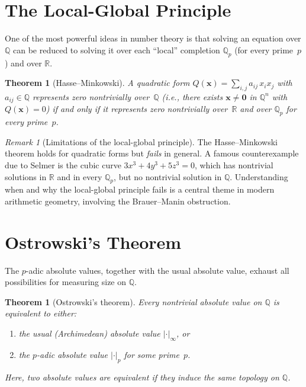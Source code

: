 \documentclass[12pt,a4paper,openany]{book}
\theoremstyle{definition}
\theoremstyle{plain}
\newtheorem{theorem}[definition]{Theorem}
\theoremstyle{remark}
\newtheorem{remark}[definition]{Remark}
\newcommand{\Q}{\mathbb{Q}}
\newcommand{\R}{\mathbb{R}}
\newcommand{\abs}[1]{\left|#1\right|}
\begin{document}
\section{The Local-Global Principle}
\label{sec:local-global}

One of the most powerful ideas in number theory is that solving an equation
over $\Q$ can be reduced to solving it over each ``local'' completion
$\Q_p$ (for every prime~$p$) and over $\R$.

\begin{theorem}[Hasse--Minkowski]
\label{thm:hasse-minkowski}
A quadratic form $Q(\mathbf{x}) = \sum_{i,j} a_{ij}\, x_i x_j$ with
$a_{ij} \in \Q$ represents zero nontrivially over~$\Q$ (i.e., there exists
$\mathbf{x} \neq \mathbf{0}$ in $\Q^n$ with $Q(\mathbf{x})=0$) if and only if
it represents zero nontrivially over~$\R$ and over $\Q_p$ for every prime~$p$.
\end{theorem}

\begin{remark}[Limitations of the local-global principle]
\label{rem:local-global-limitations}
The Hasse--Minkowski theorem holds for quadratic forms but \emph{fails} in
general. A famous counterexample due to Selmer is the cubic curve
$3x^3 + 4y^3 + 5z^3 = 0$, which has nontrivial solutions in $\R$ and in every
$\Q_p$, but no nontrivial solution in $\Q$. Understanding when and why the
local-global principle fails is a central theme in modern arithmetic geometry,
involving the Brauer--Manin obstruction.
\end{remark}

\section{Ostrowski's Theorem}
\label{sec:ostrowski}

The $p$-adic absolute values, together with the usual absolute value, exhaust
all possibilities for measuring size on $\Q$.

\begin{theorem}[Ostrowski's theorem]
\label{thm:ostrowski}
Every nontrivial absolute value on $\Q$ is equivalent to either:
\begin{enumerate}
  \item the usual (Archimedean) absolute value $\abs{\cdot}_\infty$, or
  \item the $p$-adic absolute value $\abs{\cdot}_p$ for some prime~$p$.
\end{enumerate}
Here, two absolute values are \emph{equivalent}
if they induce the same topology on $\Q$.
\end{theorem}
\end{document}
